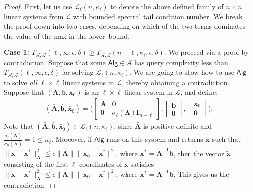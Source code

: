 \documentclass[11pt]{article}
\def\x{{\mathbf x}}
\def\Alg{{\mathsf{Alg}}}
\def\b{{\mathbf b}}
\def\A{{\mathbf A}}
\def\Ac{{\mathcal A}}
\def\Lc{{\mathcal L}}
\def\I{{\mathbf I}}
\def\zero{{\mathbf 0}}
\begin{document}
\begin{proof}
First, let us use $\Lc_\ell(n,\kappa_\ell)$ to denote the above defined family of $n\times n$ linear systems from $\Lc$ with bounded spectral tail condition number. We break the proof down into two cases, depending on which of the two terms dominates the value of the max in the lower~bound.
\smallskip

\noindent    
\textbf{Case 1:}  $T_{\Ac,\Lc}(\ell,\infty,\epsilon,\delta) \geq T_{\Ac,\Lc}(n-\ell,\kappa_\ell,\epsilon,\delta)$. We  proceed via a proof by contradiction. Suppose that some $\Alg\in\Ac$ has query complexity less than $T_{\Ac,\Lc}(\ell,\infty,\epsilon,\delta)$ for solving $\Lc_\ell(n,\kappa_\ell)$. We are going to show how to use $\Alg$ to solve \emph{all} $\ell\times \ell$ linear systems in $\Lc$, thereby obtaining a contradiction. Suppose that $(\A,\b,\x_0)$ is an $\ell\times \ell$ linear system in $\Lc$, and define:
\begin{align*}
(\bar\A,\bar\b,\bar\x_0)=\bigg(\begin{bmatrix}
    \A&\zero\\
    \zero& \sigma_{\ell}(\A)\I_{n-\ell}
\end{bmatrix}, 
\begin{bmatrix}
    \b\\ 
    \zero
\end{bmatrix},
\begin{bmatrix}
    \x_0\\ 
    \zero
\end{bmatrix}
\bigg).
\end{align*}
Note that $(\bar\A,\bar\b,\bar\x_0)\in\Lc_\ell(n,\kappa_\ell)$, since $\bar\A$ is positive definite and $\frac{\sigma_{\ell}(\bar\A)}{\sigma_n(\bar\A)}=1\leq\kappa_\ell$. Moreover, if $\Alg$ runs on this system and returns $\bar\x$ such that $\|\bar\x-\bar\x^*\|_{\bar\A}^2\leq\epsilon\|\bar\A\|\|\bar\x_0-\bar\x^*\|^2$, where $\bar\x^*=\bar\A^{-1}\bar\b$, then the vector $\tilde\x$ consisting of the first $\ell$ coordinates of $\bar\x$ satisfies $\|\tilde\x-\x^*\|_{\A}^2\leq\epsilon\|\A\|\|\x_0-\x^*\|^2$, where $\x^*=\A^{-1}\b$. This gives us the contradiction.
\smallskip


\end{proof}
\end{document}
